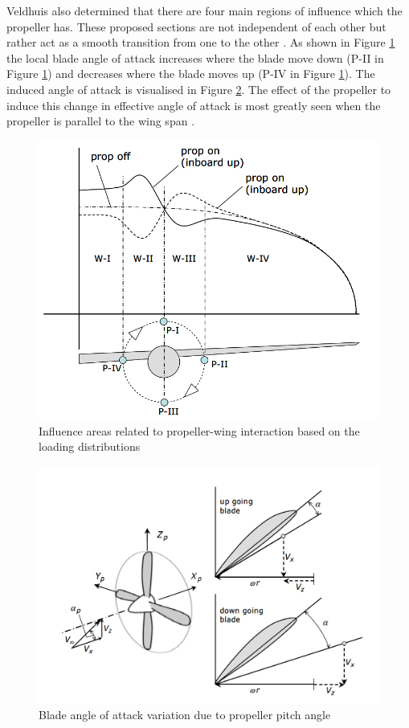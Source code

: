 
Veldhuis also determined that there are four main regions of influence which the propeller has. These proposed sections are not independent of each other but rather act as a smooth transition from one to the other \cite{Veldhuis2004}. As shown in Figure \ref{fig:propfour} the local blade angle of attack increases where the blade move down (P-II in Figure \ref{fig:propfour}) and decreases where the blade moves up (P-IV in Figure \ref{fig:propfour}). The induced angle of attack is visualised in Figure \ref{fig:propangles}. The effect of the propeller to induce this change in effective angle of attack is most greatly seen when the propeller is parallel to the wing span \cite{Veldhuis2004}.

\begin{figure}[H]
  \centering
  \includegraphics[width=0.8\linewidth]{03_LiteratureReview/Figs/four.png}
  \caption{Influence areas related to propeller-wing interaction based on the loading distributions \cite{Veldhuis2004}}
  \label{fig:propfour}
\end{figure}

\begin{figure}[H]
  \centering
  \includegraphics[width=0.8\linewidth]{03_LiteratureReview/Figs/anlges.png}
  \caption{Blade angle of attack variation due to propeller pitch angle \cite{Veldhuis2004}}
  \label{fig:propangles}
\end{figure}


